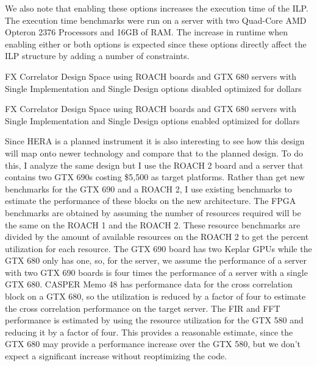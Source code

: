 We also note that enabling these options increases the execution time of the ILP.
The execution time benchmarks were run on a server with two Quad-Core AMD Opteron 2376 Processors and 16GB of RAM.
The increase in runtime when enabling either or both options is expected since these options directly affect the ILP structure by adding a number of constraints.



\begin{table}
\centering

\caption{FX Correlator Design Space using ROACH boards and GTX 680 servers with Single Implementation and Single Design options disabled optimized for dollars}
\label{tab: C6/fx_corr_si0_sd0.tex}


\caption{FX Correlator Design Space using ROACH boards and GTX 680 servers with Single Implementation and Single Design options enabled optimized for dollars}
\label{tab: C6/fx_corr_si1_sd1.tex}
\end{table} 

Since HERA is a planned instrument it is also interesting to see how this design will map onto newer technology and compare that to the planned design.
To do this, I analyze the same design but I use the ROACH 2 board and a server that contains two GTX 690s costing \$5,500 as target platforms.
Rather than get new benchmarks for the GTX 690 and a ROACH 2, I use existing benchmarks to estimate the performance of these blocks on the new architecture.
The FPGA benchmarks are obtained by assuming the number of resources required will be the same on the ROACH 1 and the ROACH 2.
These resource benchmarks are divided by the amount of available resources on the ROACH 2 to get the percent utilization for each resource.
The GTX 690 board has two Keplar GPUs while the GTX 680 only has one, so, for the server, we assume the performance of a server with two GTX 690 boards is four times the performance of a server with a single GTX 680.
CASPER Memo 48 \cite{Schollar:2012vwa} has performance data for the cross correlation block on a GTX 680, so the utilization is reduced by a factor of four to estimate the cross correlation performance on the target server.
The FIR and FFT performance is estimated by using the resource utilization for the GTX 580 and reducing it by a factor of four.
This provides a reasonable estimate, since the GTX 680 may provide a performance increase over the GTX 580, but we don't expect a significant increase without reoptimizing the code.


